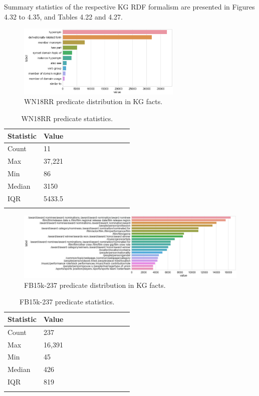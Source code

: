 \noindent Summary statistics of the respective KG RDF formalism are presented in Figures 4.32 to 4.35, and Tables 4.22 and 4.27.

\begin{figure}[H]
   	\centering
    	\includegraphics[width=0.7\textwidth, height=0.2\textheight]{WN18RR_Predicate_Counts}
	\captionsetup{justification=centering}
	\caption{WN18RR predicate distribution in KG facts.}
\end{figure}

\begin{table}[H]
		\centering
		\begin{tabular}{lllllllllll}
  			\textbf{Statistic} & \textbf{Value}  \\
  			\hline
			Count & 11 \\
			Max & 37,221  \\
			Min & 86 \\
  			Median & 3150  \\
  			IQR & 5433.5  \\
			&
		\end{tabular}
		\caption{WN18RR predicate statistics.}
\end{table}

\begin{figure}[H]
   	\centering
    	\includegraphics[width=1.0\textwidth, height=0.3\textheight]{FB15k-237_Predicate_Counts}
	\captionsetup{justification=centering}
	\caption{FB15k-237 predicate distribution in KG facts.}
\end{figure}

\begin{table}[H]
		\centering
		\begin{tabular}{lllllllllll}
  			\textbf{Statistic} & \textbf{Value}  \\
  			\hline
			Count & 237 \\
			Max & 16,391 \\
			Min & 45  \\
  			Median & 426  \\
  			IQR & 819 \\
			&
		\end{tabular}
		\caption{FB15k-237 predicate statistics.}
\end{table}

